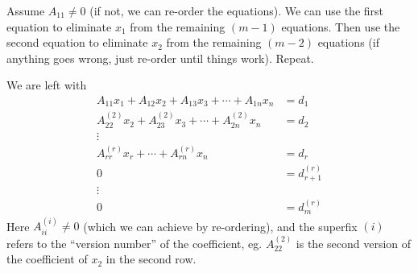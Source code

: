 \documentclass[a4paper]{article}
\begin{document}
Assume $A_{11}\not=0$ (if not, we can re-order the equations). We can use the first equation to eliminate $x_1$ from the remaining $(m - 1)$ equations. Then use the second equation to eliminate $x_2$ from the remaining $(m - 2)$ equations (if anything goes wrong, just re-order until things work). Repeat.

We are left with
\begin{align*}
  A_{11}x_1 + A_{12}x_2 + A_{13}x_3 + \cdots + A_{1n}x_n &= d_1\\
  A_{22}^{(2)}x_2 + A_{23}^{(2)}x_3 + \cdots + A_{2n}^{(2)}x_n &= d_2\\
  \vdots&\\
  A_{rr}^{(r)}x_r + \cdots + A_{rn}^{(r)}x_n &= d_r\\
  0 &= d_{r + 1}^{(r)}\\
  \vdots&\\
  0 &= d_{m}^{(r)}
\end{align*}
Here $A_{ii}^{(i)} \not=0$ (which we can achieve by re-ordering), and the superfix $(i)$ refers to the ``version number'' of the coefficient, eg. $A_{22}^{(2)}$ is the second version of the coefficient of $x_2$ in the second row.
\end{document}
